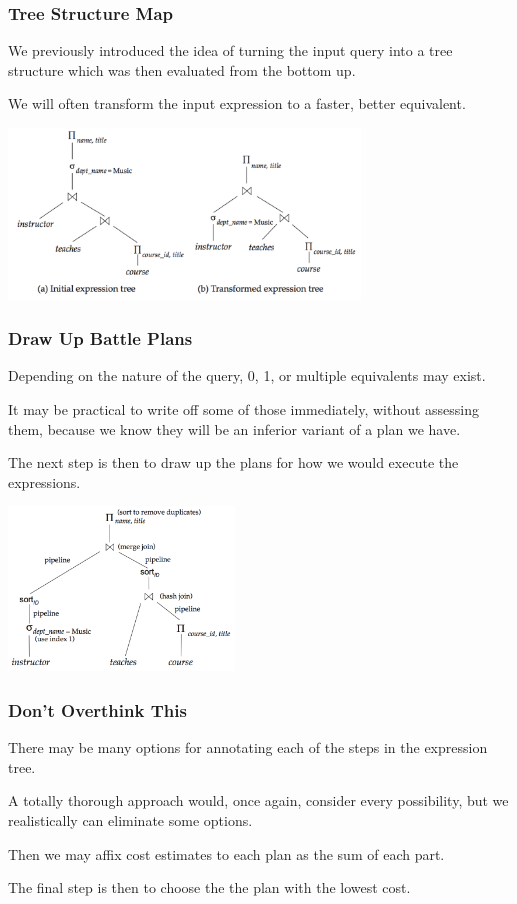 \begin{frame}
\frametitle{Tree Structure Map}
We previously introduced the idea of turning the input query into a tree structure which was then evaluated from the bottom up. 

We will often transform the input expression to a faster, better equivalent. 

\begin{center}
\includegraphics[width=0.7\textwidth]{images/optimization-1}
\end{center}


\end{frame}

\begin{frame}
\frametitle{Draw Up Battle Plans}

Depending on the nature of the query, 0, 1, or multiple equivalents may exist. 

It may be practical to write off some of those immediately, without assessing them, because we know they will be an inferior variant of a plan we have. 

The next step is then to draw up the plans for how we would execute the expressions. 

\begin{center}
\includegraphics[width=0.45\textwidth]{images/optimization-2}
\end{center}

\end{frame}


\begin{frame}
\frametitle{Don't Overthink This}

There may be many options for annotating each of the steps in the expression tree. 

A totally thorough approach would, once again, consider every possibility, but we realistically can eliminate some options. 

Then we may affix cost estimates to each plan as the sum of each part.

The final step is then to choose the the plan with the lowest cost.

\end{frame}

